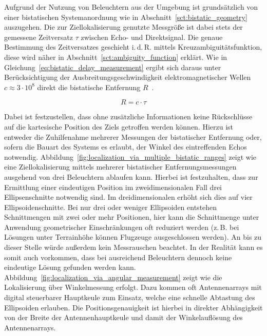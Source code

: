 Aufgrund der Nutzung von Beleuchtern aus der Umgebung ist grundsätzlich von einer bistatischen Systemanordnung wie in Abschnitt~\ref{sct:bistatic_geometry} auszugehen. Die zur Ziellokalisierung genutzte Messgröße ist dabei stets der gemessene Zeitversatz \(\tau \) zwischen Echo- und Direktsignal. Die genaue Bestimmung des Zeitversatzes geschieht i.\,d.\,R. mittels Kreuzambiguitätsfunktion, diese wird näher in Abschnitt~\ref{sct:ambiguity_function} erklärt. Wie in Gleichung~\ref{eq:bistatic_delay_measurement} ergibt sich daraus unter Berücksichtigung der Ausbreitungsgeschwindigkeit elektromagnetischer Wellen \(c \approx 3\cdot10^8\) direkt die bistatische Entfernung \(R\)~\cite[S.~11]{Malanowski2019}.

\begin{equation}
    R = c \cdot \tau
\end{equation}\label{eq:bistatic_delay_measurement}

Dabei ist festzustellen, dass ohne zusätzliche Informationen keine Rückschlüsse auf die kartesische Position des Ziels getroffen werden können. Hierzu ist entweder die Zuhilfenahme mehrerer Messungen der bistatischer Entfernung oder, sofern die Bauart des Systems es erlaubt, der Winkel des eintreffenden Echos notwendig. Abbildung~\ref{fig:localization_via_multiple_bistatic_ranges} zeigt wie eine Ziellokalisierung mittels mehrerer bistatischer Entfernungsmessungen ausgehend von drei Beleuchtern ablaufen kann. Hierbei ist festzuhalten, dass zur Ermittlung einer eindeutigen Position im zweidimensionalen Fall drei Ellipsenschnitte notwendig sind. Im dreidimensionalen erhöht sich dies auf vier Ellipsoidenschnitte. Bei nur drei oder weniger Ellipsoiden entstehen Schnittmengen mit zwei oder mehr Positionen, hier kann die Schnittmenge unter Anwendung geometrischer Einschränkungen oft reduziert werden (z.\,B. bei Lösungen unter Terrainhöhe können Flugzeuge ausgeschlossen werden). An bis zu dieser Stelle würde außerdem kein Messrauschen beachtet. In der Realität kann es somit auch vorkommen, dass bei ausreichend Beleuchtern dennoch keine eindeutige Lösung gefunden werden kann. Abbildung~\ref{fig:localization_via_angular_measurement} zeigt wie die Lokalisierung über Winkelmessung erfolgt. Dazu kommen oft Antennenarrays mit digital steuerbarer Hauptkeule zum Einsatz, welche eine schnelle Abtastung des Ellipsoiden erlauben. Die Positionsgenauigkeit ist hierbei in direkter Abhängigkeit von der Breite der Antennenhauptkeule und damit der Winkelauflösung des Antennenarrays.


